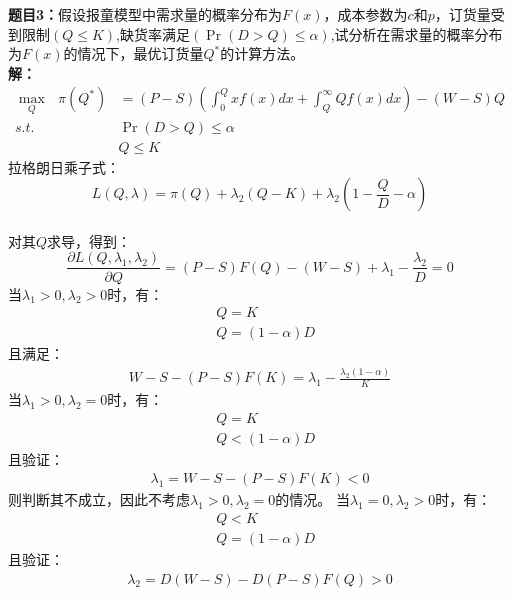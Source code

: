 \documentclass[12pt,a4paper]{article}
\begin{document}
\vspace{5pt}
\noindent
{\bf 题目3：}假设报童模型中需求量的概率分布为$F(x)$，成本参数为$c$和$p$，订货量受到限制$(Q\leq K)$,缺货率满足$(\Pr\left(D > Q\right)\leq \alpha )$,试分析在需求量的概率分布为$F(x)$的情况下，最优订货量$Q^*$的计算方法。
\vspace{5pt}
\noindent \\
{\bf 解：}
\begin{align}
    \max_Q\text{\ }\pi \left( Q^{*} \right) &=\left( P-S \right) \left( \int_0^Q{xf\left( x \right) dx+\int_Q^{\infty}{Qf\left( x \right) dx}} \right) -\left( W-S \right) Q \\
    s.t.&\Pr\left(D > Q\right)\leq \alpha \\
    &Q\le K
\end{align}
拉格朗日乘子式：
\begin{equation}
    L\left( Q,\lambda  \right) =\pi \left( Q \right) +\lambda_2\left(Q-K\right)+\lambda_2 \left( 1-\frac{Q}{D}-\alpha \right)
\end{equation} \\
对其$Q$求导，得到：
\begin{equation}
    \frac{\partial L\left( Q,\lambda_1,\lambda_2  \right)}{\partial Q} =\left( P-S \right) F(Q) -\left( W-S \right) +\lambda_1 -\frac{\lambda_2}{D} =0
\end{equation}
当$\lambda_1 >0,\lambda_2>0$时，有：
\begin{align*}
    &Q = K \\
    &Q =\left( 1-\alpha \right) D 
\end{align*}
且满足：
\begin{align*}
    W-S-\left( P-S \right) F\left( K \right) =\lambda_1-\frac{\lambda_2 (1-\alpha )}{K}
\end{align*}
当$\lambda_1 >0,\lambda_2=0$时，有：
\begin{align*}
    &Q = K \\
    &Q <\left( 1-\alpha \right) D 
\end{align*}
且验证：
\begin{align*}
    \lambda_1 = W-S-\left( P-S \right) F\left( K \right) <0
\end{align*}
则判断其不成立，因此不考虑$\lambda_1 >0,\lambda_2=0$的情况。
当$\lambda_1 =0,\lambda_2 >0$时，有：
\begin{align*}
    &Q < K \\
    &Q =\left( 1-\alpha \right) D 
\end{align*}
且验证：
\begin{align*}
    \lambda_2 =D \left(W-S\right)-D \left( P-S \right) F\left( Q \right) >0
\end{align*}
\end{document}
